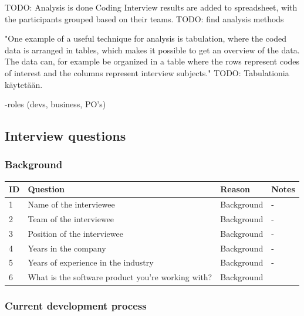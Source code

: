 \documentclass[english]{tktltiki2}
\theoremstyle{definition}
\theoremstyle{remark}
\begin{document}
TODO: Analysis is done \cite{runeson2009guidelines}
Coding
Interview results are added to spreadsheet, with the participants grouped based on their teams. TODO: find analysis methods


"One example of a useful technique for analysis is tabulation, where the coded data is arranged in tables, which makes it possible to get an overview of the data. The data can, for example be organized in a table where the rows represent codes of interest and the columns represent interview subjects." \cite{runeson2009guidelines} TODO: Tabulationia käytetään.

 -roles (devs, business, PO's)


\subsection{Interview questions}

\subsubsection{Background}

\begin{center}
    \begin{tabular}{ | l | l | l | p{5cm} |} 
    \hline
    ID & Question & Reason & Notes \\ \hline
    1 & Name of the interviewee & Background & - \\ \hline
    2 & Team of the interviewee & Background & - \\ \hline
    3 & Position of the interviewee & Background & - \\ \hline
    4 & Years in the company & Background & - \\ \hline
    5 & Years of experience in the industry & Background & - \\ \hline
    6 & What is the software product you're working with? & Background &  \\ \hline
    \hline
    \end{tabular}
\end{center}

\subsubsection{Current development process}
\end{document}
